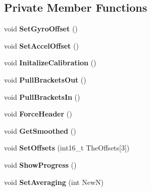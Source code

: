 \subsection*{Private Member Functions}
\begin{DoxyCompactItemize}
\item 
\mbox{\label{classSensor_1_1ICM20689_a453178b004b7fff78c751b32b9e95c34}} 
void {\bfseries Set\+Gyro\+Offset} ()
\item 
\mbox{\label{classSensor_1_1ICM20689_a8db96b63154d1eba15e5af1748af8a93}} 
void {\bfseries Set\+Accel\+Offset} ()
\item 
\mbox{\label{classSensor_1_1ICM20689_ab2fb0fd660e96c44d954e362a3c63afd}} 
void {\bfseries Initalize\+Calibration} ()
\item 
\mbox{\label{classSensor_1_1ICM20689_a5776d471f5c4f9400ba5243e6d83a708}} 
void {\bfseries Pull\+Brackets\+Out} ()
\item 
\mbox{\label{classSensor_1_1ICM20689_a16bd8afe55d0bc6341f0002865d1b98e}} 
void {\bfseries Pull\+Brackets\+In} ()
\item 
\mbox{\label{classSensor_1_1ICM20689_a67545c7a388b451cab0109bcb18ce8cd}} 
void {\bfseries Force\+Header} ()
\item 
\mbox{\label{classSensor_1_1ICM20689_a4f4b233a32eec039ff6105c38f1c180b}} 
void {\bfseries Get\+Smoothed} ()
\item 
\mbox{\label{classSensor_1_1ICM20689_a9fab9ee1874805fcac0147e899b60ae9}} 
void {\bfseries Set\+Offsets} (int16\+\_\+t The\+Offsets\mbox{[}3\mbox{]})
\item 
\mbox{\label{classSensor_1_1ICM20689_a587ff11f34ab4c3b05dd31f6885228e0}} 
void {\bfseries Show\+Progress} ()
\item 
\mbox{\label{classSensor_1_1ICM20689_a574aa4f55e31d06ad84fc63967ed2999}} 
void {\bfseries Set\+Averaging} (int NewN)

\end{DoxyCompactItemize}
